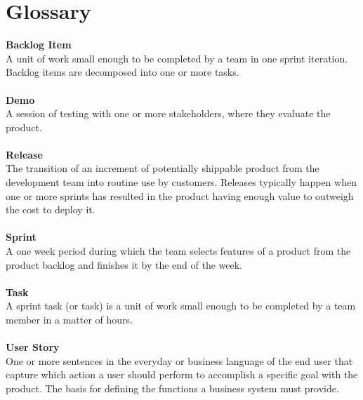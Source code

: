 \documentclass[10pt,a4paper]{report}
\begin{document}
	\section{Glossary}
		\textbf{Backlog Item}\\
		A unit of work small enough to be completed by a team in one sprint iteration. Backlog items are decomposed into one or more tasks. \\
		\\
		\textbf{Demo}\\
		A session of testing with one or more stakeholders, where they evaluate the product. \\
		\\
		\textbf{Release} \\
		The transition of an increment of potentially shippable product from the development team into routine use by customers. Releases typically happen when one or more sprints has resulted in the product having enough value to outweigh the cost to deploy it. \\
		\\
		\textbf{Sprint} \\
		A one week period during which the team selects features of a product from the product backlog and finishes it by the end of the week. \\
		\\
		\textbf{Task} \\
		A sprint task (or task) is a unit of work small enough to be completed by a team member in a matter of hours. \\
		\\
		\textbf{User Story} \\
		One or more sentences in the everyday or business language of the end user that capture which action a user should perform to accomplish a specific goal with the product. The basis for defining the functions a business system must provide.
\end{document}
